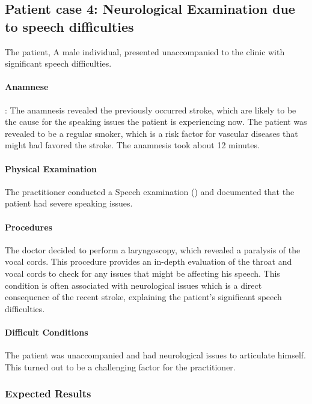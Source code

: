 \subsection{Patient case 4: Neurological Examination due to speech difficulties}\label{subsec:patient-case-4:-neurological-examination-due-to-speech-difficulties}
The patient, A male individual, presented unaccompanied to the clinic with significant speech difficulties.

\paragraph{Anamnese}:
The anamnesis revealed the previously occurred stroke, which are likely to be the cause for the speaking issues the patient is experiencing now.
The patient was revealed to be a regular smoker, which is a risk factor for vascular diseases that might had favored the stroke.
The anamnesis took about 12 minutes.

\paragraph{Physical Examination}
The practitioner conducted a Speech examination () and documented that the patient had severe speaking issues.

\paragraph{Procedures}
The doctor decided to perform a laryngoscopy, which revealed a paralysis of the vocal cords.
This procedure provides an in-depth evaluation of the throat and vocal cords to check for any issues that might be affecting his speech.
This condition is often associated with neurological issues which is a direct consequence of the recent stroke,
explaining the patient's significant speech difficulties.

\paragraph{Difficult Conditions}
The patient was unaccompanied and had neurological issues to articulate himself.
This turned out to be a challenging factor for the practitioner.

\subsubsection{Expected Results}

